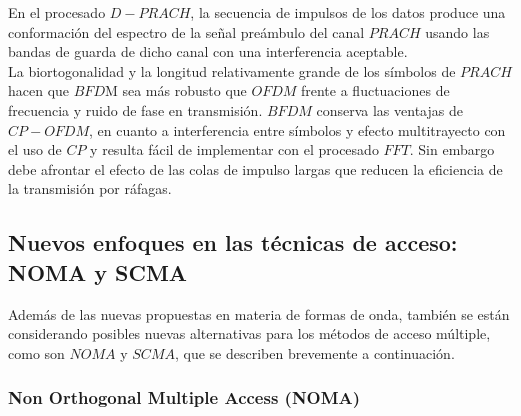 \documentclass[]{article}
\begin{document}
En el procesado $D-PRACH$, la secuencia de impulsos de los datos produce una conformación del espectro de la señal preámbulo del canal $PRACH$ usando las bandas de guarda de dicho canal con una interferencia aceptable.\\

La biortogonalidad y la longitud relativamente grande de los símbolos de $PRACH$ hacen que $BFD$M sea más robusto que $OFDM$ frente a fluctuaciones de frecuencia y ruido de fase en transmisión. $BFDM$ conserva las ventajas de $CP-OFDM$, en cuanto a interferencia entre símbolos y efecto multitrayecto con el uso de $CP$ y resulta fácil de implementar con el procesado $FFT$.
Sin embargo debe afrontar el efecto de las colas de impulso largas que reducen la eficiencia de la transmisión por ráfagas.\\

\subsection{Nuevos enfoques en las técnicas de acceso: NOMA y SCMA }

Además de las nuevas propuestas en materia de formas de onda, también se están considerando posibles nuevas alternativas para los métodos de acceso múltiple, como son $NOMA$ y $SCMA$, que se describen brevemente a continuación.\\

\subsubsection{Non Orthogonal Multiple Access (NOMA) }
\end{document}
